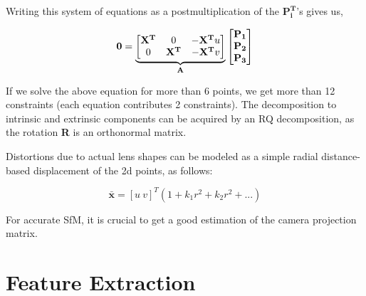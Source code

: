 Writing this system of equations as a postmultiplication of the $\mathbf{P_i^T}$'s gives us,

\[\mathbf{0} = \underbrace{\begin{bmatrix}
\mathbf{X^T} & 0 & -\mathbf{X^T}u\\
0 & \mathbf{X^T} & -\mathbf{X^T}v\\
\end{bmatrix}}_{\text{\textbf{A}}} \begin{bmatrix}
\mathbf{P_1}\\
\mathbf{P_2}\\
\mathbf{P_3}\end{bmatrix}\]

If we solve the above equation for more than 6 points, we get more than 12 constraints (each equation contributes 2 constraints). The decomposition to intrinsic and extrinsic components can be acquired by an RQ decomposition, as the rotation \textbf{R} is an orthonormal matrix.

Distortions due to actual lens shapes can be modeled as a simple radial distance-based displacement of the 2d points, as follows:

\[\bar{\mathbf{x}} = [u\ v]^T (1 + k_1r^2 + k_2r^2 + ...)\]

For accurate SfM, it is crucial to get a good estimation of the camera projection matrix. 

\section{Feature Extraction}











 



 





